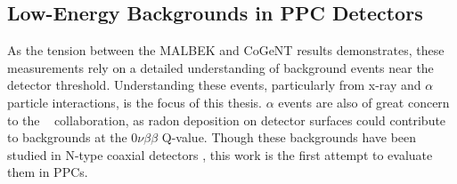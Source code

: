 \subsection{Low-Energy Backgrounds in PPC Detectors}
As the tension between the MALBEK and CoGeNT results demonstrates, these measurements rely on a detailed understanding of background events near the detector threshold. Understanding these events, particularly from x-ray and $\alpha$ particle interactions, is the focus of this thesis. $\alpha$ events are also of great concern to the \MJ~ collaboration, as radon deposition on detector surfaces could contribute to backgrounds at the $0\nu\beta\beta$ Q-value. Though these backgrounds have been studied in N-type coaxial detectors \cite{JohnsonThesis2010}, this work is the first attempt to evaluate them in PPCs.